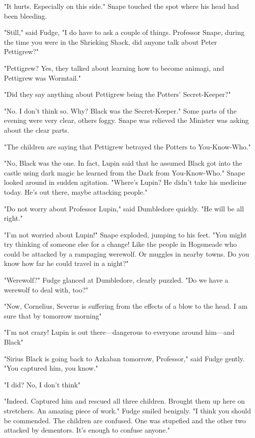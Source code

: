 "It hurts. Especially on this side." Snape touched the spot where his head had been bleeding.

"Still," said Fudge, "I do have to ask a couple of things. Professor Snape, during the time you were in the Shrieking Shack, did anyone talk about Peter Pettigrew?"

"Pettigrew? Yes, they talked about learning how to become animagi, and Pettigrew was Wormtail."

"Did they say anything about Pettigrew being the Potters' Secret-Keeper?"

"No. I don't think so. Why? Black was the Secret-Keeper." Some parts of the evening were very clear, others foggy. Snape was relieved the Minister was asking about the clear parts.

"The children are saying that Pettigrew betrayed the Potters to{\el} You-Know-Who."

"No, Black was the one. In fact, Lupin said that he assumed Black got into the castle using dark magic he learned from the Dark{\el} from You-Know-Who." Snape looked around in sudden agitation. "Where's Lupin? He didn't take his medicine today. He's out there, maybe attacking people."

"Do not worry about Professor Lupin," said Dumbledore quickly. "He will be all right."

"I'm not worried about Lupin!" Snape exploded, jumping to his feet. "You might try thinking of someone else for a change! Like the people in Hogsmeade who could be attacked by a rampaging werewolf. Or muggles in nearby towns. Do you know how far he could travel in a night?"

"Werewolf?" Fudge glanced at Dumbledore, clearly puzzled. "Do we have a werewolf to deal with, too?"

"Now, Cornelius, Severus is suffering from the effects of a blow to the head. I am sure that by tomorrow morning{\el}"

"I'm not crazy! Lupin is out there—dangerous to everyone around him—and Black{\el}"

"Sirius Black is going back to Azkaban tomorrow, Professor," said Fudge gently. "You captured him, you know."

"I did? No, I don't think{\el}"

"Indeed. Captured him and rescued all three children. Brought them up here on stretchers. An amazing piece of work." Fudge smiled benignly. "I think you should be commended. The children are confused. One was stupefied and the other two attacked by dementors. It's enough to confuse anyone."

